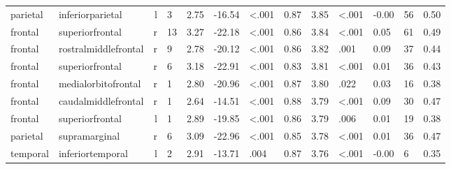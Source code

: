 \documentclass{article}
\begin{document}
\begin{longtable}{llrR{1.3cm}R{1cm}R{1.3cm}R{1cm}R{1cm}R{1.3cm}R{1cm}R{1.8cm}R{1.3cm}R{1.8cm}}
  parietal &          inferiorparietal &    l &         3 &                  2.75 &           -16.54 &      \textless.001 &                               0.87 &                          3.85 &                   \textless.001 &  -0.00 &     56 &      0.50 \\
   frontal &           superiorfrontal &    r &        13 &                  3.27 &           -22.18 &      \textless.001 &                               0.86 &                          3.84 &                   \textless.001 &   0.05 &     61 &      0.49 \\
   frontal &      rostralmiddlefrontal &    r &         9 &                  2.78 &           -20.12 &      \textless.001 &                               0.86 &                          3.82 &                            .001 &   0.09 &     37 &      0.44 \\
   frontal &           superiorfrontal &    r &         6 &                  3.18 &           -22.91 &      \textless.001 &                               0.83 &                          3.81 &                   \textless.001 &   0.01 &     36 &      0.43 \\
   frontal &       medialorbitofrontal &    r &         1 &                  2.80 &           -20.96 &      \textless.001 &                               0.87 &                          3.80 &                            .022 &   0.03 &     16 &      0.38 \\
   frontal &       caudalmiddlefrontal &    r &         1 &                  2.64 &           -14.51 &      \textless.001 &                               0.88 &                          3.79 &                   \textless.001 &   0.09 &     30 &      0.47 \\
   frontal &           superiorfrontal &    l &         1 &                  2.89 &           -19.85 &      \textless.001 &                               0.86 &                          3.79 &                            .006 &   0.01 &     19 &      0.38 \\
  parietal &             supramarginal &    r &         6 &                  3.09 &           -22.96 &      \textless.001 &                               0.85 &                          3.78 &                   \textless.001 &   0.01 &     36 &      0.47 \\
  temporal &          inferiortemporal &    l &         2 &                  2.91 &           -13.71 &               .004 &                               0.87 &                          3.76 &                   \textless.001 &  -0.00 &      6 &      0.35 \\

\end{longtable}
\end{document}
